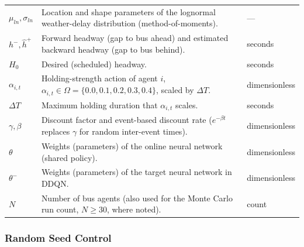 \begin{table}[htbp]
\begin{tabularx}{\textwidth}{
>{\RaggedRight\arraybackslash}p{}
>{\RaggedRight\arraybackslash}X
>{\RaggedRight\arraybackslash}p{}
}
$\mu_{ln},\sigma_{ln}$ &
Location and shape parameters of the lognormal weather-delay distribution (method-of-moments). &
--- \\

$h^-,\hat{h}^+$ &
Forward headway (gap to bus ahead) and estimated backward headway (gap to bus behind). &
seconds \\

$H_0$ &
Desired (scheduled) headway. &
seconds \\

$\alpha_{i,t}$ &
Holding-strength action of agent $i$, $\alpha_{i,t}\in\Omega=\{0.0,0.1,0.2,0.3,0.4\}$, scaled by $\Delta T$. &
dimensionless \\

$\Delta T$ &
Maximum holding duration that $\alpha_{i,t}$ scales. &
seconds \\

$\gamma,\beta$ &
Discount factor and event-based discount rate ($e^{-\beta t}$ replaces $\gamma$ for random inter-event times). &
dimensionless \\

$\theta$ &
Weights (parameters) of the online neural network (shared policy). &
dimensionless \\

$\theta^-$ &
Weights (parameters) of the target neural network in DDQN. &
dimensionless \\

$N$ &
Number of bus agents (also used for the Monte Carlo run count, $N\geq30$, where noted). &
count \\

\bottomrule
\end{tabularx}
\end{table}

\subsubsection{Random Seed Control}

